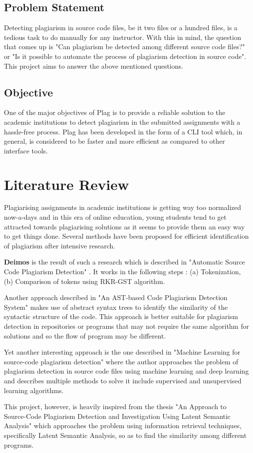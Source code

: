 \documentclass[12pt]{article}
\begin{document}
\subsection{Problem Statement}
Detecting plagiarism in source code files, be it two files or a hundred files, is a tedious task to do manually for any instructor. With this in mind, the question that comes up is "Can plagiarism be detected among different source code files?" or "Is it possible to automate the process of plagiarism detection in source code". This project aims to answer the above mentioned questions.

\subsection{Objective}
One of the major objectives of Plag is to provide a reliable solution to the academic institutions to detect plagiarism in the submitted assignments with a hassle-free process. Plag has been developed in the form of a CLI tool which, in general, is considered to be faster and more efficient as compared to other interface tools. \par


\section{Literature Review}
Plagiarising assignments in academic institutions is getting way too normalized now-a-days and in this era of online education, young students tend to get attracted towards plagiarising solutions as it seems to provide them an easy way to get things done. Several methods have been proposed for efficient identification of plagiarism after intensive research. \par \textbf{Deimos} is the result of such a research which is described in "Automatic Source Code Plagiarism Detection" \cite{article}. It works in the following steps : (a) Tokenization, (b) Comparison of tokens using RKR-GST  algorithm. \par
Another approach described in "An AST-based Code Plagiarism Detection System" \cite{5286623} makes use of abstract syntax trees to identify the similarity of the syntactic structure of the code. This approach is better suitable for plagiarism detection in repositories or programs that may not require the same algorithm for solutions and so the flow of program may be different. \par
Yet another interesting approach is the one described in "Machine Learning for source-code plagiarism detection" \cite{8575900} where the author approaches the problem of plagiarism detection in source code files using machine learning and deep learning and describes multiple methods to solve it include supervised and unsupervised learning algorithms. \par
This project, however, is heavily inspired from the thesis "An Approach to Source-Code Plagiarism Detection and Investigation Using Latent Semantic Analysis" \cite{6086533} which approaches the problem using information retrieval techniques, specifically Latent Semantic Analysis, so as to find the similarity among different programs.
\end{document}
